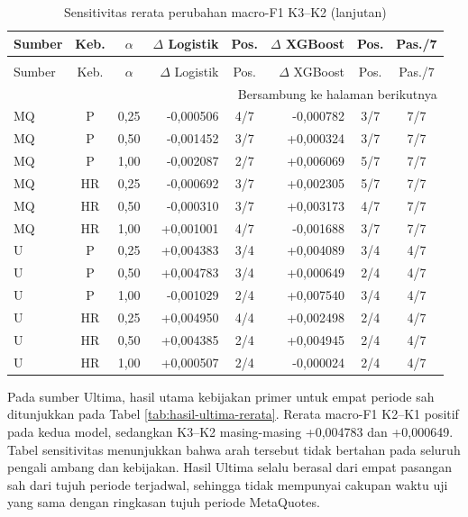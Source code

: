 \begingroup
\small
\setlength{\tabcolsep}{4pt}
\begin{longtable}{lccrcrcc}
\caption{Sensitivitas rerata perubahan macro-F1 K3--K2}\label{tab:hasil-sensitivitas-makro}\\
\toprule
Sumber & Keb. & $\alpha$ & $\Delta$ Logistik & Pos. & $\Delta$ XGBoost & Pos. & Pas./7 \\
\midrule
\endfirsthead
\caption[]{Sensitivitas rerata perubahan macro-F1 K3--K2 (lanjutan)}\\
\toprule
Sumber & Keb. & $\alpha$ & $\Delta$ Logistik & Pos. & $\Delta$ XGBoost & Pos. & Pas./7 \\
\midrule
\endhead
\midrule
\multicolumn{8}{r}{Bersambung ke halaman berikutnya} \\
\endfoot
\endlastfoot
MQ & P & 0,25 & -0,000506 & 4/7 & -0,000782 & 3/7 & 7/7 \\
MQ & P & 0,50 & -0,001452 & 3/7 & +0,000324 & 3/7 & 7/7 \\
MQ & P & 1,00 & -0,002087 & 2/7 & +0,006069 & 5/7 & 7/7 \\
MQ & HR & 0,25 & -0,000692 & 3/7 & +0,002305 & 5/7 & 7/7 \\
MQ & HR & 0,50 & -0,000310 & 3/7 & +0,003173 & 4/7 & 7/7 \\
MQ & HR & 1,00 & +0,001001 & 4/7 & -0,001688 & 3/7 & 7/7 \\
U & P & 0,25 & +0,004383 & 3/4 & +0,004089 & 3/4 & 4/7 \\
U & P & 0,50 & +0,004783 & 3/4 & +0,000649 & 2/4 & 4/7 \\
U & P & 1,00 & -0,001029 & 2/4 & +0,007540 & 3/4 & 4/7 \\
U & HR & 0,25 & +0,004950 & 4/4 & +0,002498 & 2/4 & 4/7 \\
U & HR & 0,50 & +0,004385 & 2/4 & +0,004945 & 2/4 & 4/7 \\
U & HR & 1,00 & +0,000507 & 2/4 & -0,000024 & 2/4 & 4/7 \\
\bottomrule
\end{longtable}
\endgroup


Pada sumber Ultima, hasil utama kebijakan primer untuk empat periode sah ditunjukkan pada Tabel \ref{tab:hasil-ultima-rerata}. Rerata macro-F1 K2--K1 positif pada kedua model, sedangkan K3--K2 masing-masing +0,004783 dan +0,000649. Tabel sensitivitas menunjukkan bahwa arah tersebut tidak bertahan pada seluruh pengali ambang dan kebijakan. Hasil Ultima selalu berasal dari empat pasangan sah dari tujuh periode terjadwal, sehingga tidak mempunyai cakupan waktu uji yang sama dengan ringkasan tujuh periode MetaQuotes.


